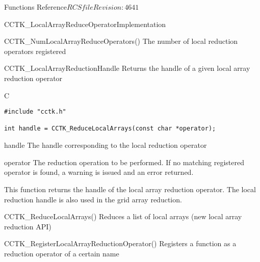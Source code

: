 \begin{cactuspart}{ Functions Reference}{$RCSfile$}{$Revision: 4641 $}
\begin{FunctionDescription}{CCTK\_LocalArrayReduceOperatorImplementation}
\begin{SeeAlsoSection}
\begin{SeeAlso}{CCTK\_NumLocalArrayReduceOperators()}
The number of local reduction operators registered
\end{SeeAlso}
\end{SeeAlsoSection}
\end{FunctionDescription}

\begin{FunctionDescription}{CCTK\_LocalArrayReductionHandle}
\label{CCTK-LocalArrayReductionHandle}
Returns the handle of a given local array reduction operator

\begin{SynopsisSection}
\begin{Synopsis}{C}
\begin{verbatim}
#include "cctk.h"

int handle = CCTK_ReduceLocalArrays(const char *operator);
\end{verbatim}
\end{Synopsis}
\end{SynopsisSection}

\begin{ResultSection}
\begin{Result}{handle}
The handle corresponding to the local reduction operator
\end{Result}
\end{ResultSection}

\begin{ParameterSection}
\begin{Parameter}{operator}
The reduction operation to be performed. If no matching registered operator
is found, a warning is issued and an error returned.
\end{Parameter}
\end{ParameterSection}

\begin{Discussion}
This function returns the handle of the local array reduction operator. The local
reduction handle is also used in the grid array reduction.
\end{Discussion}

\begin{SeeAlsoSection}
\begin{SeeAlso}{CCTK\_ReduceLocalArrays()}
Reduces a list of local arrays (new local array reduction API)
\end{SeeAlso}

\begin{SeeAlso}{CCTK\_RegisterLocalArrayReductionOperator()}
Registers a function as a reduction operator of a certain name
\end{SeeAlso}


\end{SeeAlsoSection}
\end{FunctionDescription}
\end{cactuspart}

